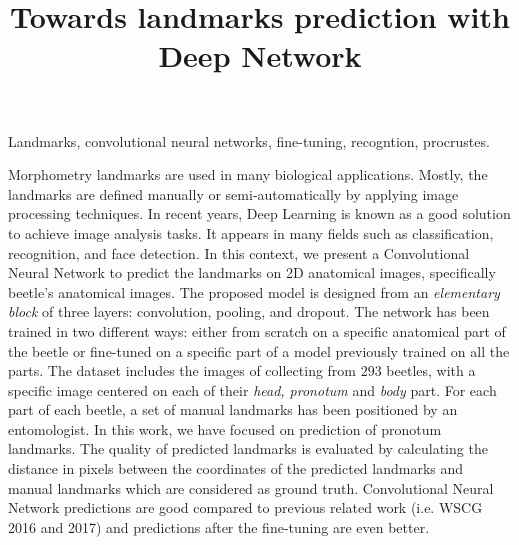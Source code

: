\documentclass[10pt]{article}
\begin{document}
\noindent



\title{Towards landmarks prediction with Deep Network}




\maketitle

\keywords
Landmarks, convolutional neural networks, fine-tuning, recogntion, procrustes.

\abstract
Morphometry landmarks are used in many biological
applications. Mostly, the landmarks are defined manually or
semi-automatically by applying image processing techniques. In recent
years, Deep Learning is known as a good solution to achieve image analysis tasks. It appears in many fields such as
classification, recognition, and face detection. In this context, we
present a Convolutional Neural Network to predict the landmarks on 2D
anatomical images, specifically beetle's anatomical images. The proposed model is designed from an \textit{elementary block} of three layers: convolution, pooling, and dropout. The network has been trained in two different ways: either from scratch on a specific anatomical part of the beetle or fine-tuned on a specific part of a model previously trained on all the parts. The dataset includes the images of 
collecting from $293$ beetles, with a specific image centered on each of their \textit{head, pronotum} and \textit{body} part.
 For each part of each beetle, a set of manual landmarks has been positioned by an entomologist. In this work, we have focused on prediction of pronotum landmarks. The quality of predicted landmarks
is evaluated by calculating the distance in pixels between the
coordinates of the predicted landmarks and manual landmarks which are
considered as ground truth. Convolutional Neural Network predictions are good compared to previous related work (i.e. WSCG 2016 and 2017) and predictions after the fine-tuning are even better.
\end{document}
